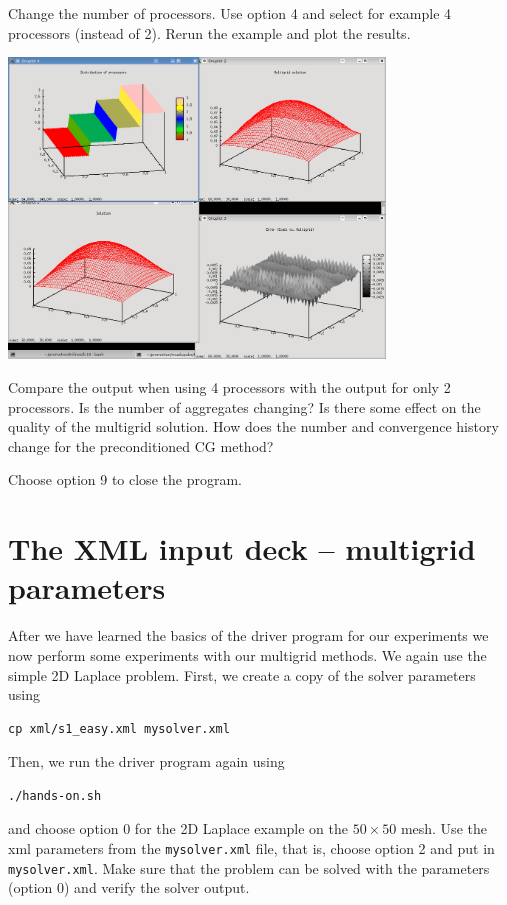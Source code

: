 \documentclass[10pt,fleqn]{book}
\begin{document}
\begin{exercise}
Change the number of processors. Use option 4 and select for example 4 processors (instead of 2). Rerun the example and plot the results.
\begin{center}\includegraphics[width=10cm]{pics/tut1_9.png} \end{center}
\end{exercise}
\begin{exercise}
Compare the output when using 4 processors with the output for only 2 processors. Is the number of aggregates changing? Is there some effect on the quality of the multigrid solution. How does the number and convergence history change for the preconditioned CG method?
\end{exercise}
\begin{exercise}
Choose option 9 to close the program.
\end{exercise}

\section{The XML input deck -- multigrid parameters}

After we have learned the basics of the driver program for our experiments we now perform some experiments with our multigrid methods. We again use the simple 2D Laplace problem. First, we create a copy of the solver parameters using
\begin{verbatim}
cp xml/s1_easy.xml mysolver.xml
\end{verbatim}
Then, we run the driver program again using
\begin{verbatim}
./hands-on.sh
\end{verbatim}
and choose option 0 for the 2D Laplace example on the $50\times 50$ mesh. Use the xml parameters from the \texttt{mysolver.xml} file, that is, choose option 2 and put in \texttt{mysolver.xml}. Make sure that the problem can be solved with the parameters (option 0) and verify the solver output.
\end{document}
